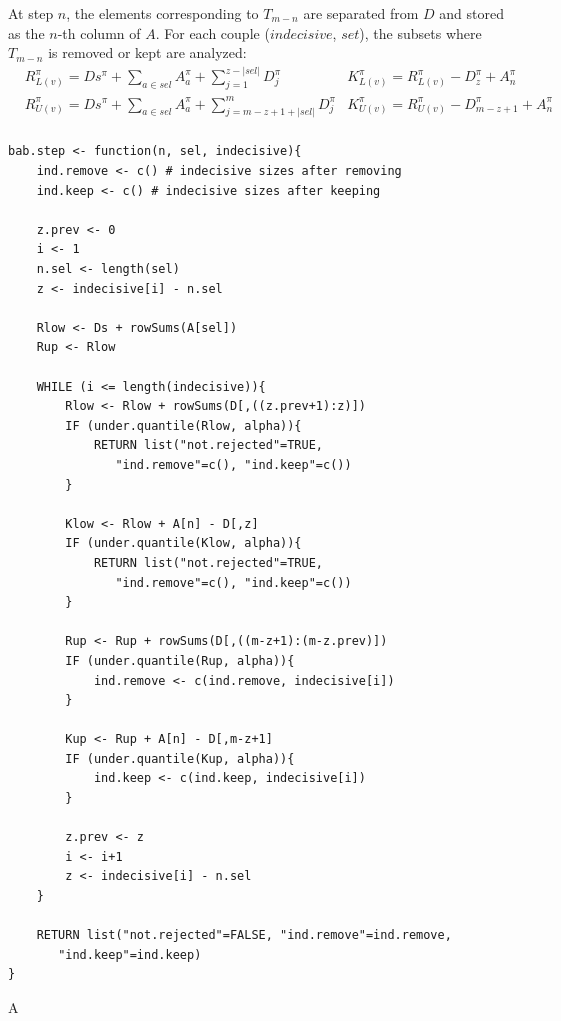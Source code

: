 \documentclass[11pt,a4paper,openright,twoside]{article}
\begin{document}
At step $n$, the elements corresponding to $T_{m-n}$ are separated from $D$ and stored as the $n$-th column of $A$. For each couple ($indecisive$, $set$), the subsets where $T_{m-n}$ is removed or kept are analyzed:
\begin{align*}
& R_{L(v)}^{\pi}=Ds^{\pi}+\sum_{a\in sel}A_a^{\pi}+\sum_{j=1}^{z-|sel|} D_j^{\pi} & K_{L(v)}^{\pi}=R_{L(v)}^{\pi} - D_z^{\pi} + A_n^{\pi}\\
& R_{U(v)}^{\pi}=Ds^{\pi}+\sum_{a\in sel}A_a^{\pi}+\sum_{j=m-z+1+|sel|}^{m} D_j^{\pi} & K_{U(v)}^{\pi}=R_{U(v)}^{\pi} - D_{m-z+1}^{\pi} + A_n^{\pi}\\
\end{align*}
\begin{lstlisting}
bab.step <- function(n, sel, indecisive){
	ind.remove <- c() # indecisive sizes after removing
	ind.keep <- c() # indecisive sizes after keeping

	z.prev <- 0
	i <- 1
	n.sel <- length(sel)
	z <- indecisive[i] - n.sel

	Rlow <- Ds + rowSums(A[sel])
	Rup <- Rlow

	WHILE (i <= length(indecisive)){
		Rlow <- Rlow + rowSums(D[,((z.prev+1):z)])
		IF (under.quantile(Rlow, alpha)){
			RETURN list("not.rejected"=TRUE,
			   "ind.remove"=c(), "ind.keep"=c())
		}

		Klow <- Rlow + A[n] - D[,z]
		IF (under.quantile(Klow, alpha)){
			RETURN list("not.rejected"=TRUE,
			   "ind.remove"=c(), "ind.keep"=c())
		}

		Rup <- Rup + rowSums(D[,((m-z+1):(m-z.prev)])
		IF (under.quantile(Rup, alpha)){
			ind.remove <- c(ind.remove, indecisive[i])
		}

		Kup <- Rup + A[n] - D[,m-z+1]
		IF (under.quantile(Kup, alpha)){
			ind.keep <- c(ind.keep, indecisive[i])
		}

		z.prev <- z
		i <- i+1
		z <- indecisive[i] - n.sel
	}

	RETURN list("not.rejected"=FALSE, "ind.remove"=ind.remove,
	   "ind.keep"=ind.keep)
}
\end{lstlisting}

A
\end{document}
